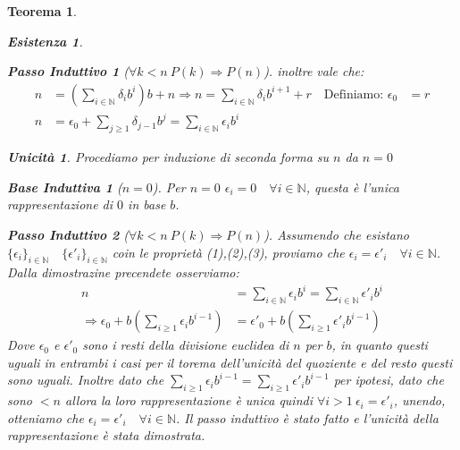 \documentclass{article}
\makeatletter
\renewenvironment{proof}[1][\proofname]{\par
    \pushQED{\qed}%
    \normalfont \topsep6\p@\@plus6\p@\relax
    \trivlist
    \item\relax
    {\itshape
    #1\@addpunct{.}}\hspace\labelsep\ignorespaces
    }{%
    \popQED\endtrivlist\@endpefalse
}
\newtheorem{theorem}{Teorema}[part]
\theoremstyle{definition}
\newtheorem*{existence}{Esistenza}
\newtheorem*{uniqueness}{Unicità}
\newtheorem*{base}{Base Induttiva}
\newtheorem*{step}{Passo Induttivo}
\makeatother
\begin{document}
\begin{theorem}
\begin{proof}
\begin{existence}
\begin{step}[$\forall k<n\ P(k)\Rightarrow P(n)$]
                inoltre vale che:
                \[
                    \begin{aligned}
                        n&=\left(\sum_{i\in\mathbb{N}}\delta_ib^i\right)b+n\Rightarrow n=\sum_{i\in\mathbb{N}}\delta_ib^{i+1}+r\quad \text{Definiamo: }\epsilon_0&=r\\
                        n&=\epsilon_0+\sum_{j\geq 1}\delta_{j-1}b^j=\sum_{i\in\mathbb{N}}\epsilon_ib^i
                    \end{aligned}
                \]
            \end{step}
        \end{existence}
        \begin{uniqueness}
            Procediamo per induzione di seconda forma su \(n\) da \(n=0\)
            \begin{base}[$n=0$]
                Per \(n=0\) \(\epsilon_i=0\quad \forall i\in\mathbb{N}\), questa è l'unica rappresentazione di \(0\) in base \(b\).
            \end{base}
            \begin{step}[$\forall k<n\ P(k)\Rightarrow P(n)$]
                Assumendo che esistano \(\{\epsilon_i\}_{i\in\mathbb{N}}\quad \{\epsilon'_i\}_{i\in\mathbb{N}}\) coin le proprietà (1),(2),(3), proviamo che \(\epsilon_i=\epsilon'_i\quad \forall i\in\mathbb{N}\). 
                Dalla dimostrazine precendete osserviamo:
                \[
                    \begin{aligned}
                        n&=\sum_{i\in\mathbb{N}}\epsilon_ib^i=\sum_{i\in\mathbb{N}}\epsilon'_ib^i\\
                        \Rightarrow \epsilon_0+b(\sum_{i\geq1}\epsilon_ib^{i-1})&=\epsilon'_0+b(\sum_{i\geq1}\epsilon'_ib^{i-1})
                    \end{aligned}
                \]
                Dove \(\epsilon_0\) e \(\epsilon'_0\) sono i resti della divisione euclidea di \(n\) per \(b\), in quanto questi uguali in entrambi i casi per il torema dell'unicità del quoziente e del resto questi sono uguali.
                Inoltre dato che \(\sum_{i\geq1}\epsilon_ib^{i-1}=\sum_{i\geq1}\epsilon'_ib^{i-1}\) per ipotesi, dato che sono \(<n\) allora la loro rappresentazione è unica quindi \(\forall i>1\ \epsilon_i=\epsilon'_i\), unendo, otteniamo che \(\epsilon_i=\epsilon'_i\quad \forall i\in\mathbb{N}\).
                Il passo induttivo è stato fatto e l'unicità della rappresentazione è stata dimostrata.
            \end{step}
        \end{uniqueness}
        \raggedleft{\pushQED{\ensuremath{\blacksquare}}}
    \end{proof}
\end{theorem}
\end{document}
